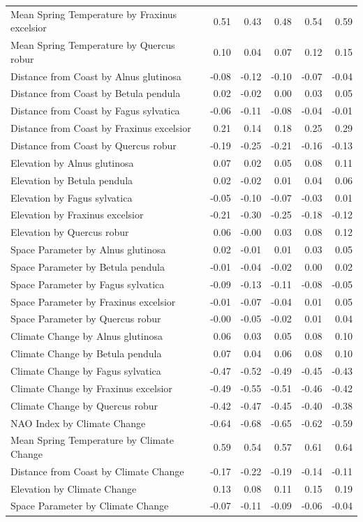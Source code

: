 \documentclass{article}\usepackage[]{graphicx}\usepackage[]{color}
\begin{document}
\begin{longtable}{lrrrrr}
  Mean Spring 
Temperature
by Fraxinus excelsior & 0.51 & 0.43 & 0.48 & 0.54 & 0.59 \\ 
  Mean Spring 
Temperature
by Quercus robur & 0.10 & 0.04 & 0.07 & 0.12 & 0.15 \\ 
  Distance from 
Coast
by Alnus glutinosa & -0.08 & -0.12 & -0.10 & -0.07 & -0.04 \\ 
  Distance from 
Coast
by Betula pendula & 0.02 & -0.02 & 0.00 & 0.03 & 0.05 \\ 
  Distance from 
Coast
by Fagus sylvatica & -0.06 & -0.11 & -0.08 & -0.04 & -0.01 \\ 
  Distance from 
Coast
by Fraxinus excelsior & 0.21 & 0.14 & 0.18 & 0.25 & 0.29 \\ 
  Distance from 
Coast
by Quercus robur & -0.19 & -0.25 & -0.21 & -0.16 & -0.13 \\ 
  Elevation
by Alnus glutinosa & 0.07 & 0.02 & 0.05 & 0.08 & 0.11 \\ 
  Elevation
by Betula pendula & 0.02 & -0.02 & 0.01 & 0.04 & 0.06 \\ 
  Elevation
by Fagus sylvatica & -0.05 & -0.10 & -0.07 & -0.03 & 0.01 \\ 
  Elevation
by Fraxinus excelsior & -0.21 & -0.30 & -0.25 & -0.18 & -0.12 \\ 
  Elevation
by Quercus robur & 0.06 & -0.00 & 0.03 & 0.08 & 0.12 \\ 
  Space Parameter
by Alnus glutinosa & 0.02 & -0.01 & 0.01 & 0.03 & 0.05 \\ 
  Space Parameter
by Betula pendula & -0.01 & -0.04 & -0.02 & 0.00 & 0.02 \\ 
  Space Parameter
by Fagus sylvatica & -0.09 & -0.13 & -0.11 & -0.08 & -0.05 \\ 
  Space Parameter
by Fraxinus excelsior & -0.01 & -0.07 & -0.04 & 0.01 & 0.05 \\ 
  Space Parameter
by Quercus robur & -0.00 & -0.05 & -0.02 & 0.01 & 0.04 \\ 
  Climate Change
by Alnus glutinosa & 0.06 & 0.03 & 0.05 & 0.08 & 0.10 \\ 
  Climate Change
by Betula pendula & 0.07 & 0.04 & 0.06 & 0.08 & 0.10 \\ 
  Climate Change
by Fagus sylvatica & -0.47 & -0.52 & -0.49 & -0.45 & -0.43 \\ 
  Climate Change
by Fraxinus excelsior & -0.49 & -0.55 & -0.51 & -0.46 & -0.42 \\ 
  Climate Change
by Quercus robur & -0.42 & -0.47 & -0.45 & -0.40 & -0.38 \\ 
  NAO Index by Climate Change & -0.64 & -0.68 & -0.65 & -0.62 & -0.59 \\ 
  Mean Spring 
Temperature by Climate Change & 0.59 & 0.54 & 0.57 & 0.61 & 0.64 \\ 
  Distance from 
Coast by Climate Change & -0.17 & -0.22 & -0.19 & -0.14 & -0.11 \\ 
  Elevation by Climate Change & 0.13 & 0.08 & 0.11 & 0.15 & 0.19 \\ 
  Space Parameter by Climate Change & -0.07 & -0.11 & -0.09 & -0.06 & -0.04 \\ 
   \hline
\hline
\end{longtable}
\end{document}
